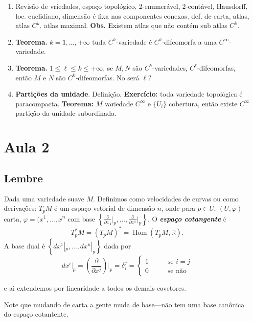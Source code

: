 \begin{enumerate}
\item Revisão de vriedades, espaço topológico, 2-enumerável, 2-contável, Hausdorff, loc. euclidiano, dimensão é fixa nas componentes conexas, def. de carta, atlas, atlas \(C^k\), atlas maximal. \textbf{Obs.} Existem atlas que não contém sub atlas \(C^k\).
\item \textbf{Teorema.} \(k=1,\ldots, +\infty\) tuda \(C^k\)-variedade é  \(C^k\)-difeomorfa a uma \(C^\infty\)-variedade.
\item \textbf{Teorema.} \(1 \leq  \ell \leq  k \leq +\infty\), se \(M,N\) são \(C^k\)-variedades, \(C^\ell\)-difeomorfas, então \(M\) e $N$ são \(C^k\)-difeomorfas. {\color{2}No será \(\ell?\)}
\item \textbf{Partições da unidade}. Definição. \textbf{Exercício:} toda variedade topológica é paracompacta. \textbf{Teorema:} \(M\) variedade \(C^\infty\) e \(\{ U_i\}\) cobertura, então existe \(C^\infty\) partição da unidade subordinada. 
\end{enumerate}


\section{Aula 2}

\subsection{Lembre}

Dada uma variedade suave \(M\). Definimos como velocidades de curvas ou como derivações: \(T_pM\) é um espaço vetorial de dimensão $n$, onde para \(p \in U\), \((U, \varphi)\) carta, \(\varphi=(x^1,\ldots,x^n\) com base \(\left\{ \frac{\partial }{\partial x_1}\Big|_{p},\ldots,\frac{\partial }{\partial x^n}\Big|_{p} \right\} \). O \textit{\textbf{espaço cotangente}} é
\[T^*_p M=(T_pM)^* =\operatorname{Hom}(T_pM,\mathbb{R}).\]
A base dual é \(\left\{ dx^1|_{p},\ldots,dx^n|_{p} \right\} \) dada por
\[ dx^i|_{p}=\left(\frac{\partial }{\partial x^j}\right)\Big|_{p}=\delta_i^j=\begin{cases}
	1\qquad &\text{se } i=j \\
	0\qquad &\text{se não} 
\end{cases}\]

e ai extendemos por linearidade a todos os demais covetores.

\begin{remark}\leavevmode
	Note que mudando de carta a gente muda de base---não tem uma base canônica do espaço cotantente.
\end{remark}

